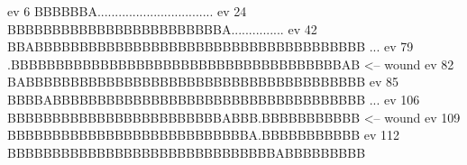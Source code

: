 \begtt
ev   6   BBBBBBA.................................
ev  24   BBBBBBBBBBBBBBBBBBBBBBBBA...............
ev  42   BBABBBBBBBBBBBBBBBBBBBBBBBBBBBBBBBBBBBBB
          ...
ev  79   .BBBBBBBBBBBBBBBBBBBBBBBBBBBBBBBBBBBBBAB  <-- wound
ev  82   BABBBBBBBBBBBBBBBBBBBBBBBBBBBBBBBBBBBBBB
ev  85   BBBBABBBBBBBBBBBBBBBBBBBBBBBBBBBBBBBBBBB
          ...
ev 106   BBBBBBBBBBBBBBBBBBBBBBBBABBB.BBBBBBBBBBB  <-- wound
ev 109   BBBBBBBBBBBBBBBBBBBBBBBBBBBA.BBBBBBBBBBB
ev 112   BBBBBBBBBBBBBBBBBBBBBBBBBBBBBBABBBBBBBBB
\endtt
